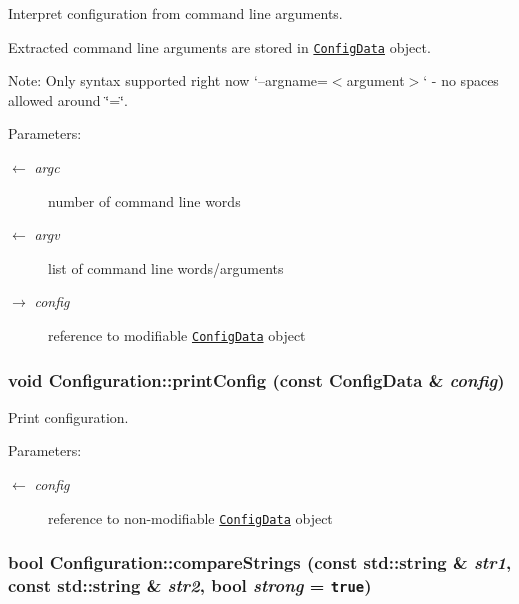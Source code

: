 Interpret configuration from command line arguments. 

Extracted command line arguments are stored in {\tt \hyperlink{classConfiguration_1_1ConfigData}{Config\-Data}} object.

\begin{Desc}
\item[Note:]Only syntax supported right now `--argname=$<$argument$>$` - no spaces allowed around \char`\"{}=\char`\"{}.\end{Desc}
\begin{Desc}
\item[Parameters:]
\begin{description}
\item[\mbox{$\leftarrow$} {\em argc}]number of command line words \item[\mbox{$\leftarrow$} {\em argv}]list of command line words/arguments \item[\mbox{$\rightarrow$} {\em config}]reference to modifiable {\tt \hyperlink{classConfiguration_1_1ConfigData}{Config\-Data}} object \end{description}
\end{Desc}
\hypertarget{namespaceConfiguration_c58339bca4863c15eee2d3bfc7f2a563}{
\subsubsection[printConfig]{\setlength{\rightskip}{0pt plus 5cm}void Configuration::print\-Config (const Config\-Data \& {\em config})}}
\label{namespaceConfiguration_c58339bca4863c15eee2d3bfc7f2a563}


Print configuration. 

\begin{Desc}
\item[Parameters:]
\begin{description}
\item[\mbox{$\leftarrow$} {\em config}]reference to non-modifiable {\tt \hyperlink{classConfiguration_1_1ConfigData}{Config\-Data}} object \end{description}
\end{Desc}
\hypertarget{namespaceConfiguration_0106b3f61292a595d6c4cc92c8c4812e}{
\subsubsection[compareStrings]{\setlength{\rightskip}{0pt plus 5cm}bool Configuration::compare\-Strings (const std::string \& {\em str1}, const std::string \& {\em str2}, bool {\em strong} = {\tt true})}}
\label{namespaceConfiguration_0106b3f61292a595d6c4cc92c8c4812e}



